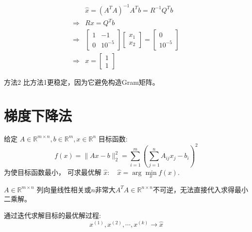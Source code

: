 \begin{example}
\begin{equation}\begin{aligned}
    &\hat{x}=\left(A^{T} A\right)^{-1} A^{T} b=R^{-1} Q^{T} b \\
    \Rightarrow& R x=Q^{T} b\\
    \Rightarrow& \left[\begin{array}{cc}1 & -1 \\ 0 & 10^{-5}\end{array}\right]\left[\begin{array}{l}x_{1} \\ x_{2}\end{array}\right]=\left[\begin{array}{l}0 \\ 10^{-5}\end{array}\right] \\
    \Rightarrow& x=\left[\begin{array}{l}1 \\ 1\end{array}\right]
\end{aligned}\end{equation}

\end{example}

方法2 比方法1更稳定，因为它避免构造Gram矩阵。



\section{梯度下降法}

给定 $ A \in \mathbb{R}^{m \times n}, {b} \in \mathbb{R}^{m}, x \in \mathbb{R}^{n} $ 目标函数:
\begin{equation}
f(x)=\|A x-b\|_{2}^{2}=\sum_{i=1}^{m}\left(\sum_{j=1}^{n} A_{i j} x_{j}-b_{i}\right)^{2}
\end{equation}
为使目标函数最小， 可求最优解 $ \hat{x}: \quad \hat{x}=\arg \underset{x}{ \min } f(x) $.

\begin{problem}
    $ A \in \mathbb{R}^{{m} \times n} $ 列向量线性相关或$n$非常大$
    A^{T} A \in \mathbb{R}^{n \times n}$不可逆，无法直接代入求得最小二乘解。
\end{problem}

通过迭代求解目标的最优解过程: \begin{equation} x^{(1)}, x^{(2)}, \cdots, x^{(k)} \rightarrow \hat{x} \end{equation} 

